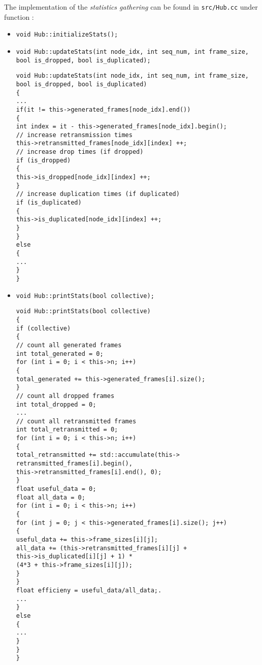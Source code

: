 The implementation of the \emph{statistics gathering} can be found in \texttt{src/Hub.cc} under function :
\begin{itemize}
    \item \texttt{void Hub::initializeStats();}
    \item \texttt{void Hub::updateStats(int node\_idx, int seq\_num, int frame\_size, bool is\_dropped, bool is\_duplicated);}
    \begin{verbatim}
void Hub::updateStats(int node_idx, int seq_num, int frame_size, 
bool is_dropped, bool is_duplicated)
{
...
if(it != this->generated_frames[node_idx].end())
{
int index = it - this->generated_frames[node_idx].begin();
// increase retransmission times
this->retransmitted_frames[node_idx][index] ++;
// increase drop times (if dropped)
if (is_dropped)
{
this->is_dropped[node_idx][index] ++;
}
// increase duplication times (if duplicated)
if (is_duplicated)
{
this->is_duplicated[node_idx][index] ++;
}
}
else
{
...
}
}
    \end{verbatim}
    \item \texttt{void Hub::printStats(bool collective);}
    \begin{verbatim}
void Hub::printStats(bool collective)
{
if (collective)
{
// count all generated frames
int total_generated = 0;
for (int i = 0; i < this->n; i++)
{
total_generated += this->generated_frames[i].size();
}
// count all dropped frames
int total_dropped = 0;
...
// count all retransmitted frames
int total_retransmitted = 0;
for (int i = 0; i < this->n; i++)
{
total_retransmitted += std::accumulate(this->
retransmitted_frames[i].begin(), 
this->retransmitted_frames[i].end(), 0);
}
float useful_data = 0;
float all_data = 0;
for (int i = 0; i < this->n; i++)
{
for (int j = 0; j < this->generated_frames[i].size(); j++)
{
useful_data += this->frame_sizes[i][j];
all_data += (this->retransmitted_frames[i][j] + 
this->is_duplicated[i][j] + 1) * 
(4*3 + this->frame_sizes[i][j]);
}
}
float efficieny = useful_data/all_data;.
...
}
else
{
...
}
}
}
    \end{verbatim}
\end{itemize}
